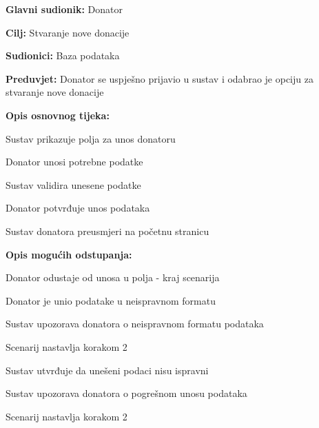 					\noindent {}
					\begin{packed_item}
	
						\item \textbf{Glavni sudionik: }Donator
						\item  \textbf{Cilj:} Stvaranje nove donacije
						\item  \textbf{Sudionici:} Baza podataka
						\item  \textbf{Preduvjet:} Donator se uspješno prijavio u sustav i odabrao je opciju za stvaranje nove donacije
						\item  \textbf{Opis osnovnog tijeka:}
						
						\item[] \begin{packed_enum}
							\item Sustav prikazuje polja za unos donatoru
							\item Donator unosi potrebne podatke
							\item Sustav validira unesene podatke
							\item Donator potvrđuje unos podataka
							\item Sustav donatora preusmjeri na početnu stranicu
						\end{packed_enum}

						\item  \textbf{Opis mogućih odstupanja:}

						\item[] \begin{packed_item}
							\item[2.a] Donator odustaje od unosa u polja - kraj scenarija
							\item[3.a] Donator je unio podatake u neispravnom formatu
							\item[] \begin{packed_enum}
								\item Sustav upozorava donatora o neispravnom formatu podataka
								\item Scenarij nastavlja korakom 2 
							\end{packed_enum}	
							\item[5.a] Sustav utvrđuje da unešeni podaci nisu ispravni
							\item[] \begin{packed_enum}
								\item Sustav upozorava donatora o pogrešnom unosu podataka
								\item Scenarij nastavlja korakom 2 
							\end{packed_enum}					
						\end{packed_item}
					\end{packed_item}
					
